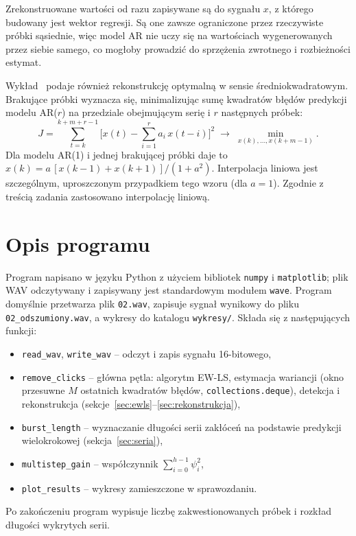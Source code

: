 \documentclass[11pt,a4paper]{article}
\begin{document}
Zrekonstruowane wartości od razu zapisywane są do sygnału $x$, z którego
budowany jest wektor regresji. Są one zawsze ograniczone przez rzeczywiste
próbki sąsiednie, więc model AR nie uczy się na wartościach wygenerowanych
przez siebie samego, co mogłoby prowadzić do sprzężenia zwrotnego
i rozbieżności estymat.

Wykład~\cite{wyklad} podaje również rekonstrukcję optymalną w sensie
średniokwadratowym. Brakujące próbki wyznacza się, minimalizując sumę
kwadratów błędów predykcji modelu AR($r$) na przedziale obejmującym serię
i $r$ następnych próbek:
\begin{equation}
  J = \sum_{t=k}^{k+m+r-1} \Big[x(t) - \sum_{i=1}^{r} a_i\, x(t-i)\Big]^2
  \;\longrightarrow\; \min_{x(k),\dots,x(k+m-1)} .
\end{equation}
Dla modelu AR(1) i jednej brakującej próbki daje to
$\hat x(k) = a\,[x(k-1)+x(k+1)]/(1+a^2)$. Interpolacja liniowa jest
szczególnym, uproszczonym przypadkiem tego wzoru (dla $a = 1$). Zgodnie
z treścią zadania zastosowano interpolację liniową.

\section{Opis programu}

Program napisano w języku Python z użyciem bibliotek \texttt{numpy}
i \texttt{matplotlib}; plik WAV odczytywany i zapisywany jest standardowym
modułem \texttt{wave}. Program domyślnie przetwarza plik \texttt{02.wav},
zapisuje sygnał wynikowy do pliku \texttt{02\_odszumiony.wav}, a wykresy
do katalogu \texttt{wykresy/}. Składa się z następujących funkcji:
\begin{itemize}
  \item \texttt{read\_wav}, \texttt{write\_wav} -- odczyt i zapis sygnału
        16-bitowego,
  \item \texttt{remove\_clicks} -- główna pętla: algorytm EW-LS, estymacja
        wariancji (okno przesuwne $M$ ostatnich kwadratów błędów,
        \texttt{collections.deque}), detekcja i rekonstrukcja
        (sekcje~\ref{sec:ewls}--\ref{sec:rekonstrukcja}),
  \item \texttt{burst\_length} -- wyznaczanie długości serii zakłóceń
        na podstawie predykcji wielokrokowej (sekcja~\ref{sec:seria}),
  \item \texttt{multistep\_gain} -- współczynnik $\sum_{i=0}^{h-1}\psi_i^2$,
  \item \texttt{plot\_results} -- wykresy zamieszczone w sprawozdaniu.
\end{itemize}
Po zakończeniu program wypisuje liczbę zakwestionowanych próbek i rozkład
długości wykrytych serii.
\end{document}
